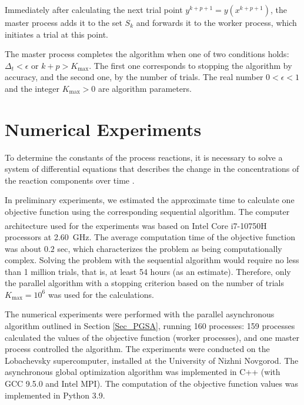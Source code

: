 \documentclass{svproc}
\begin{document}
Immediately after calculating the next trial point $y^{k+p+1} = y(x^{k+p+1})$, the master process adds it to the set $S_k$ and forwards it to the worker process, which initiates a trial at this point.

The master process completes the algorithm when one of two conditions holds: $\Delta_{t}<\epsilon$ or $k+p>K_{\mathrm{max}}$.
The first one corresponds to stopping the algorithm by accuracy, and the second one, by the number of trials. The real number $0<\epsilon<1$ and the integer $K_{\mathrm{max}}>0$ are algorithm parameters.

\section{Numerical Experiments} \label{Sec_Exp}

To determine the constants of the process reactions, it is necessary to solve a system of differential equations that describes the change in the concentrations of the reaction components over time \cite{cao2019}.

In preliminary experiments, we estimated the approximate time to calculate one objective function using the corresponding sequential algorithm. The computer architecture used for the experiments was based on Intel\textsuperscript{\tiny\textregistered} Core\textsuperscript{\tiny\texttrademark} i7-10750H processors at 2.60~GHz. The average computation time of the objective function was about $0.2$ sec, which characterizes the problem as being computationally complex. Solving the problem with the sequential algorithm would require no less than 1 million trials, that is, at least 54 hours (as an estimate). Therefore, only the parallel algorithm with a stopping criterion based on the number of trials $K_{\mathrm{max}}=10^6$ was used for the calculations.

The numerical experiments were performed with the parallel asynchronous algorithm outlined in Section \ref{Sec_PGSA}, running 160 processes: 159 processes calculated the values of the objective function (worker processes), and one master process controlled the algorithm. The experiments were conducted on the Lobachevsky supercomputer, installed at the University of Nizhni Novgorod. The asynchronous global optimization algorithm was implemented in C++ (with GCC 9.5.0 and Intel MPI). The computation of the objective function values was implemented in Python 3.9.
\end{document}
